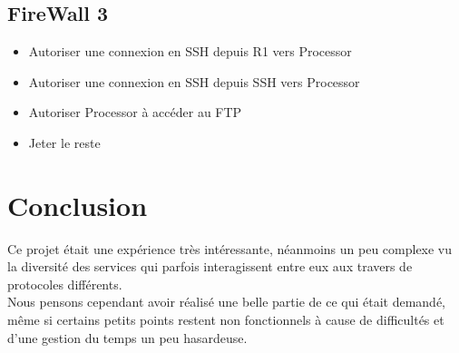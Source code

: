 \documentclass[a4paper,10pt,final,fleqn]{article}
\begin{document}
  \subsection{FireWall 3}

  \begin{itemize}
    \item Autoriser une connexion en SSH depuis R1 vers Processor
    \item Autoriser une connexion en SSH depuis SSH vers Processor
    \item Autoriser Processor à accéder au FTP
    \item Jeter le reste
  \end{itemize}

 \section{Conclusion}

 	Ce projet était une expérience très intéressante, néanmoins un peu complexe vu la diversité des services qui parfois interagissent entre eux aux travers de protocoles différents.\\

 	Nous pensons cependant avoir réalisé une belle partie de ce qui était demandé, même si certains petits points restent non fonctionnels à cause de difficultés et d'une gestion du temps un peu hasardeuse.\\
\end{document}
